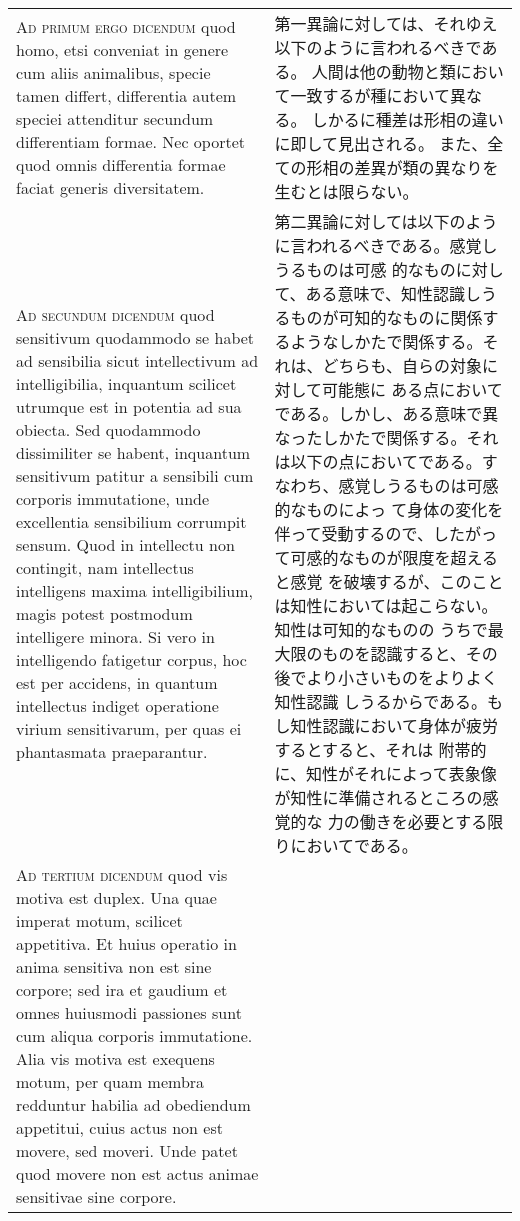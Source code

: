 \documentclass[10pt]{jsarticle} %
\begin{document}
\begin{longtable}{p{21em}p{21em}}
\\



{\scshape Ad primum ergo dicendum} quod homo, etsi conveniat in genere cum aliis
animalibus, specie tamen differt, differentia autem speciei attenditur
secundum differentiam formae. Nec oportet quod omnis differentia
formae faciat generis diversitatem.

&

第一異論に対しては、それゆえ以下のように言われるべきである。
人間は他の動物と類において一致するが種において異なる。
しかるに種差は形相の違いに即して見出される。
また、全ての形相の差異が類の異なりを生むとは限らない。

\\



{\scshape Ad secundum dicendum} quod sensitivum quodammodo se habet ad sensibilia
sicut intellectivum ad intelligibilia, inquantum scilicet utrumque est
in potentia ad sua obiecta. Sed quodammodo dissimiliter se habent,
inquantum sensitivum patitur a sensibili cum corporis immutatione,
unde excellentia sensibilium corrumpit sensum. Quod in intellectu non
contingit, nam intellectus intelligens maxima intelligibilium, magis
potest postmodum intelligere minora. Si vero in intelligendo fatigetur
corpus, hoc est per accidens, in quantum intellectus indiget
operatione virium sensitivarum, per quas ei phantasmata praeparantur.

&

第二異論に対しては以下のように言われるべきである。感覚しうるものは可感
的なものに対して、ある意味で、知性認識しうるものが可知的なものに関係す
るようなしかたで関係する。それは、どちらも、自らの対象に対して可能態に
ある点においてである。しかし、ある意味で異なったしかたで関係する。それ
は以下の点においてである。すなわち、感覚しうるものは可感的なものによっ
て身体の変化を伴って受動するので、したがって可感的なものが限度を超えると感覚
を破壊するが、このことは知性においては起こらない。知性は可知的なものの
 うちで最大限のものを認識すると、その後でより小さいものをよりよく知性認識
 しうるからである。もし知性認識において身体が疲労するとすると、それは
 附帯的に、知性がそれによって表象像が知性に準備されるところの感覚的な
 力の働きを必要とする限りにおいてである。

\\



{\scshape Ad tertium dicendum} quod vis motiva est duplex. Una quae imperat
motum, scilicet appetitiva. Et huius operatio in anima sensitiva non
est sine corpore; sed ira et gaudium et omnes huiusmodi passiones sunt
cum aliqua corporis immutatione. Alia vis motiva est exequens motum,
per quam membra redduntur habilia ad obediendum appetitui, cuius actus
non est movere, sed moveri. Unde patet quod movere non est actus
animae sensitivae sine corpore.


\end{longtable}
\end{document}
